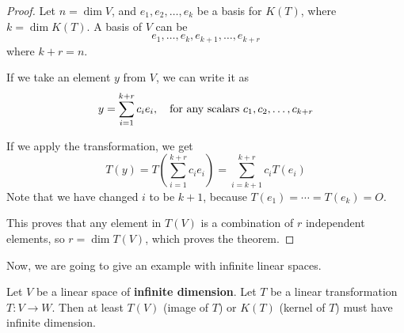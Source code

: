 \documentclass[../linear-spaces.tex]{subfiles}
\begin{document}
\begin{proof}
    Let $n=\dim V$, and $e_1,e_2,\dots,e_k$ be a basis for $K(T)$, where
    $k=\dim K(T)$. A basis of $V$ can be
    \begin{equation*}
        e_1,\dots,e_k,e_{k+1},\dots,e_{k+r}
    \end{equation*}
    where $k+r=n$.

    If we take an element $y$ from $V$, we can write it as
    \begin{equation*}
        y=\sum^{k+r}_{i=1}{c_i e_i}, \quad \textnormal{for any scalars } c_1,c_2,\dots,c_{k+r}
    \end{equation*}

    If we apply the transformation, we get
    \begin{equation*}
        T(y)=T\left(\sum^{k+r}_{i=1}{c_i e_i}\right) = \sum^{k+r}_{i=k+1}{c_i T(e_i)}
    \end{equation*}
    Note that we have changed $i$ to be $k+1$, because $T(e_1) = \cdots = T(e_k) = O$.

    This proves that any element in $T(V)$ is a combination of $r$ independent
    elements, so $r=\dim T(V)$, which proves the theorem.
\end{proof}

Now, we are going to give an example with infinite linear spaces.

\begin{theorem}
    Let $V$ be a linear space of \textbf{infinite dimension}.
    Let $T$ be a linear transformation $T: V\to W$. Then at least
    $T(V)$ (image of $T$) or $K(T)$ (kernel of $T$) must have infinite
    dimension.
\end{theorem}
\end{document}
